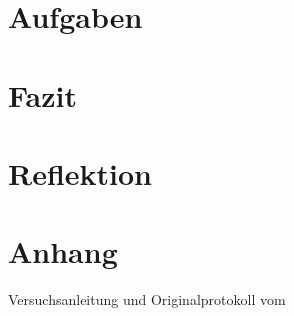 \documentclass[12pt, a4paper, twoside]{article}
\begin{document}



\section{Aufgaben}
\section{Fazit}
\section{Reflektion}
\section{Anhang}
Versuchsanleitung und Originalprotokoll vom \labdate
\end{document}
